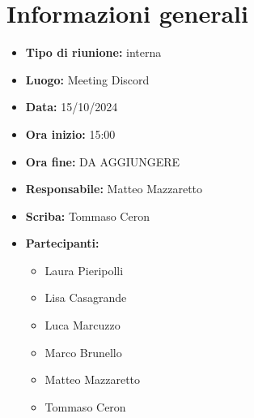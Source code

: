 \section{Informazioni generali}

\begin{itemize}
    \item \textbf{Tipo di riunione:} interna
    \item \textbf{Luogo:} Meeting Discord
    \item \textbf{Data:} 15/10/2024
    \item \textbf{Ora inizio:} 15:00
    \item \textbf{Ora fine:} DA AGGIUNGERE
    \item \textbf{Responsabile:} Matteo Mazzaretto 
    \item \textbf{Scriba:} Tommaso Ceron
    \item \textbf{Partecipanti:}
    \begin{itemize}
        \renewcommand{\labelitemii}{--}
        \item Laura Pieripolli
        \item Lisa Casagrande
        \item Luca Marcuzzo
        \item Marco Brunello
        \item Matteo Mazzaretto
        \item Tommaso Ceron
    \end{itemize}
\end{itemize}